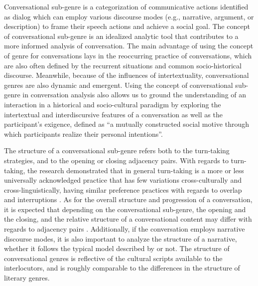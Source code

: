 \documentclass[12pt]{article}
\begin{document}
Conversational sub-genre is a categorization of communicative actions identified as dialog which can employ various discourse modes (e.g., narrative, argument, or description) to frame their speech actions and achieve a social goal. The concept of conversational sub-genre is an idealized analytic tool that contributes to a more informed analysis of conversation. The main advantage of using the concept of genre for conversations lays in the reoccurring practice of conversations, which are also often defined by the recurrent situations and common socio-historical discourse. Meanwhile, because of the influences of intertextuality, conversational genres are also dynamic and emergent. Using the concept of conversational sub-genre in conversation analysis also allows us to ground the understanding of an interaction in a historical and socio-cultural paradigm by exploring the intertextual and interdiscursive features of a conversation as well as the participant's exigence, defined as ``a mutually constructed social motive through which participants realize their personal intentions''\parencite[p. 333]{mayes2005}.

The structure of a conversational sub-genre refers both to the turn-taking strategies, and to the opening or closing adjacency pairs. With regards to turn-taking, the research demonstrated that in general turn-taking is a more or less universally acknowledged practice that has few variations cross-culturally and cross-linguistically, having similar preference practices with regards to overlap and interruptions \parencite{stivers2009}. As for the overall structure and progression of a conversation, it is expected that depending on the conversational sub-genre, the opening and the closing, and the relative structure of a conversational content may differ with regards to adjacency pairs \parencite{ruhlemann2013}. Additionally, if the conversation employs narrative discourse modes, it is also important to analyze the structure of a narrative, whether it follows the typical model described by \textcite{labov1967} or not. The structure of conversational genres is reflective of the cultural scripts available to the interlocutors, and is roughly comparable to the differences in the structure of literary genres.
\end{document}
